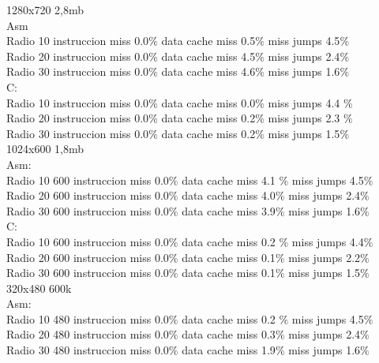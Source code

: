 1280x720 2,8mb \\

Asm \\
	Radio 10 instruccion miss   0.0$\%$  data cache miss  0.5$\%$ miss jumps   4.5$\%$ \\
	Radio 20 instruccion miss   0.0$\%$  data cache miss  4.5$\%$ miss jumps   2.4$\%$ \\	
	Radio 30 instruccion miss   0.0$\%$  data cache miss  4.6$\%$ miss jumps   1.6$\%$ \\

C: \\
	Radio 10 instruccion miss  0.0$\%$  data cache miss 0.0$\%$ miss jumps  4.4 $\%$  \\
	Radio 20 instruccion miss  0.0$\%$  data cache miss 0.2$\%$ miss jumps   2.3 $\%$  \\
	Radio 30 instruccion miss  0.0$\%$  data cache miss 0.2$\%$ miss jumps   1.5$\%$  \\ 

1024x600 1,8mb \\

Asm:\\ 
	Radio 10 600  	instruccion miss 0.0$\%$  data cache miss  4.1 $\%$ miss jumps  4.5$\%$  \\
	Radio 20 600  instruccion miss 0.0$\%$  data cache miss  4.0$\%$ miss jumps 2.4$\%$     \\
	Radio 30 600  	instruccion miss 0.0$\%$  data cache miss  3.9$\%$ miss jumps   1.6$\%$   \\

C: \\
	Radio 10 600  	instruccion miss  0.0$\%$ data cache miss 0.2 $\%$ miss jumps  4.4$\%$ \\
	Radio 20 600  	instruccion miss  0.0$\%$ data cache miss 0.1$\%$ miss jumps 2.2$\%$ \\
	Radio 30 600  	instruccion miss  0.0$\%$ data cache miss 0.1$\%$ miss jumps  1.5$\%$ \\

320x480 600k \\

Asm: \\
	Radio 10 480  	instruccion miss 0.0$\%$  data cache miss  0.2 $\%$ miss jumps  4.5$\%$	\\
	Radio 20 480  instruccion miss 0.0$\%$  data cache miss  0.3$\%$ miss jumps 2.4$\%$	\\
	Radio 30 480  	instruccion miss 0.0$\%$  data cache miss  1.9$\%$ miss jumps   1.6$\%$	\\

